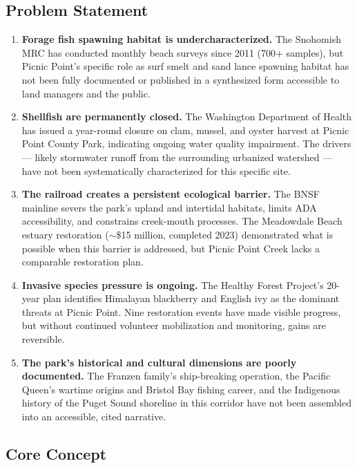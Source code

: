\documentclass[11pt,letterpaper]{article}
\begin{document}
\subsection{Problem Statement}

\begin{enumerate}
  \item \textbf{Forage fish spawning habitat is undercharacterized.} The Snohomish MRC has conducted monthly beach surveys since 2011 (700+ samples), but Picnic Point's specific role as surf smelt and sand lance spawning habitat has not been fully documented or published in a synthesized form accessible to land managers and the public.

  \item \textbf{Shellfish are permanently closed.} The Washington Department of Health has issued a year-round closure on clam, mussel, and oyster harvest at Picnic Point County Park, indicating ongoing water quality impairment. The drivers --- likely stormwater runoff from the surrounding urbanized watershed --- have not been systematically characterized for this specific site.

  \item \textbf{The railroad creates a persistent ecological barrier.} The BNSF mainline severs the park's upland and intertidal habitats, limits ADA accessibility, and constrains creek-mouth processes. The Meadowdale Beach estuary restoration ($\sim$\$15 million, completed 2023) demonstrated what is possible when this barrier is addressed, but Picnic Point Creek lacks a comparable restoration plan.

  \item \textbf{Invasive species pressure is ongoing.} The Healthy Forest Project's 20-year plan identifies Himalayan blackberry and English ivy as the dominant threats at Picnic Point. Nine restoration events have made visible progress, but without continued volunteer mobilization and monitoring, gains are reversible.

  \item \textbf{The park's historical and cultural dimensions are poorly documented.} The Franzen family's ship-breaking operation, the Pacific Queen's wartime origins and Bristol Bay fishing career, and the Indigenous history of the Puget Sound shoreline in this corridor have not been assembled into an accessible, cited narrative.
\end{enumerate}

\subsection{Core Concept}
\end{document}

